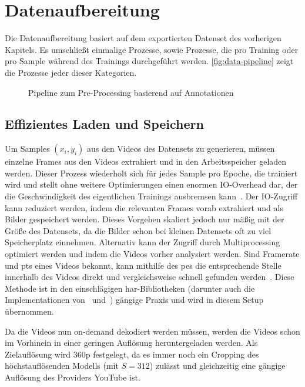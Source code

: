 \section{Datenaufbereitung}
\label{sec:pre-processing}

Die Datenaufbereitung basiert auf dem exportierten Datenset des vorherigen Kapitels.
Es umschließt einmalige Prozesse, sowie Prozesse, die pro Training oder pro Sample während des Trainings durchgeführt werden.
\autoref{fig:data-pipeline} zeigt die Prozesse jeder dieser Kategorien.

\begin{figure}
    \centering
    \caption{Pipeline zum Pre-Processing basierend auf Annotationen}
    \label{fig:data-pipeline}
\end{figure}

\subsection{Effizientes Laden und Speichern}
\label{subsec:effiziente-speicherung}

Um Samples $(x_i, y_i)$ aus den Videos des Datensets zu generieren, müssen einzelne Frames aus den Videos extrahiert und in den Arbeitsspeicher geladen werden.
Dieser Prozess wiederholt sich für jedes Sample pro Epoche, die trainiert wird und stellt ohne weitere Optimierungen einen enormen IO-Overhead dar, der die Geschwindigkeit des eigentlichen Trainings ausbremsen kann~\cite{Wu20}.
Der IO-Zugriff kann \zB reduziert werden, indem die relevanten Frames vorab extrahiert und als Bilder gespeichert werden.
Dieses Vorgehen skaliert jedoch nur mäßig mit der Größe des Datensets, da die Bilder schon bei kleinen Datensets oft zu viel Speicherplatz einnehmen.
Alternativ kann der Zugriff durch Multiprocessing optimiert werden und indem die Videos vorher analysiert werden.
Sind Framerate und \gls{pts} eines Videos bekannt, kann mithilfe des \gls{pes} die entsprechende Stelle innerhalb des Videos direkt und vergleichsweise schnell gefunden werden~\cite{Fischer10}.
Diese Methode ist in den einschlägigen \gls{har}-Bibliotheken (darunter auch die Implementationen von~\cite{Feichtenhofer18} und~\cite{Wang19}) gängige Praxis und wird in diesem Setup übernommen.

Da die Videos nun on-demand dekodiert werden müssen, werden die Videos schon im Vorhinein in einer geringen Auflösung heruntergeladen werden.
Als Zielauflösung wird 360p festgelegt, da es immer noch ein Cropping des höchstauflösenden Modells (mit $S=312$) zulässt und gleichzeitig eine gängige Auflösung des Providers YouTube ist.

